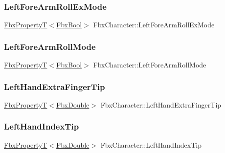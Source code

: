 \subsubsection{\texorpdfstring{Left\+Fore\+Arm\+Roll\+Ex\+Mode}{LeftForeArmRollExMode}}
{\footnotesize\ttfamily \hyperlink{class_fbx_property_t}{Fbx\+PropertyT}$<$\hyperlink{fbxtypes_8h_a92e0562b2fe33e76a242f498b362262e}{Fbx\+Bool}$>$ Fbx\+Character\+::\+Left\+Fore\+Arm\+Roll\+Ex\+Mode}

\mbox{\label{class_fbx_character_ad39cf58d8bedc3f53f81361425d1253d}} 
\subsubsection{\texorpdfstring{Left\+Fore\+Arm\+Roll\+Mode}{LeftForeArmRollMode}}
{\footnotesize\ttfamily \hyperlink{class_fbx_property_t}{Fbx\+PropertyT}$<$\hyperlink{fbxtypes_8h_a92e0562b2fe33e76a242f498b362262e}{Fbx\+Bool}$>$ Fbx\+Character\+::\+Left\+Fore\+Arm\+Roll\+Mode}

\mbox{\label{class_fbx_character_a3a19b1cede7154da466412bb01220f2c}} 
\subsubsection{\texorpdfstring{Left\+Hand\+Extra\+Finger\+Tip}{LeftHandExtraFingerTip}}
{\footnotesize\ttfamily \hyperlink{class_fbx_property_t}{Fbx\+PropertyT}$<$\hyperlink{fbxtypes_8h_a171e72a1c46fc15c1a6c9c31948c1c5b}{Fbx\+Double}$>$ Fbx\+Character\+::\+Left\+Hand\+Extra\+Finger\+Tip}

\mbox{\label{class_fbx_character_a1ae3703bd72f19cff4b80605c1480821}} 
\subsubsection{\texorpdfstring{Left\+Hand\+Index\+Tip}{LeftHandIndexTip}}
{\footnotesize\ttfamily \hyperlink{class_fbx_property_t}{Fbx\+PropertyT}$<$\hyperlink{fbxtypes_8h_a171e72a1c46fc15c1a6c9c31948c1c5b}{Fbx\+Double}$>$ Fbx\+Character\+::\+Left\+Hand\+Index\+Tip}

